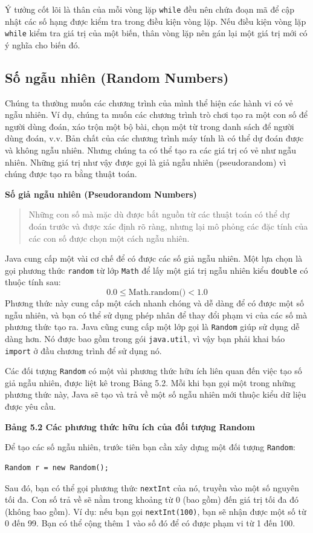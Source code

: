 Ý tưởng cốt lõi là thân của mỗi vòng lặp \texttt{while} đều nên chứa đoạn mã để cập nhật các số hạng được kiểm tra trong điều kiện vòng lặp. Nếu điều kiện vòng lặp \texttt{while} kiểm tra giá trị của một biến, thân vòng lặp nên gán lại một giá trị mới có ý nghĩa cho biến đó.

\subsection*{Số ngẫu nhiên (Random Numbers)}

Chúng ta thường muốn các chương trình của mình thể hiện các hành vi có vẻ ngẫu nhiên. Ví dụ, chúng ta muốn các chương trình trò chơi tạo ra một con số để người dùng đoán, xáo trộn một bộ bài, chọn một từ trong danh sách để người dùng đoán, v.v. Bản chất của các chương trình máy tính là có thể dự đoán được và không ngẫu nhiên. Nhưng chúng ta có thể tạo ra các giá trị có vẻ như ngẫu nhiên. Những giá trị như vậy được gọi là giả ngẫu nhiên (pseudorandom) vì chúng được tạo ra bằng thuật toán.

\textbf{Số giả ngẫu nhiên (Pseudorandom Numbers)}
\begin{quote}
Những con số mà mặc dù được bắt nguồn từ các thuật toán có thể dự đoán trước và được xác định rõ ràng, nhưng lại mô phỏng các đặc tính của các con số được chọn một cách ngẫu nhiên.
\end{quote}

Java cung cấp một vài cơ chế để có được các số giả ngẫu nhiên. Một lựa chọn là gọi phương thức \texttt{random} từ lớp \texttt{Math} để lấy một giá trị ngẫu nhiên kiểu \texttt{double} có thuộc tính sau:
\[
0.0 \le \text{Math.random()} < 1.0
\]
Phương thức này cung cấp một cách nhanh chóng và dễ dàng để có được một số ngẫu nhiên, và bạn có thể sử dụng phép nhân để thay đổi phạm vi của các số mà phương thức tạo ra. Java cũng cung cấp một lớp gọi là \texttt{Random} giúp sử dụng dễ dàng hơn. Nó được bao gồm trong gói \texttt{java.util}, vì vậy bạn phải khai báo \texttt{import} ở đầu chương trình để sử dụng nó.

Các đối tượng \texttt{Random} có một vài phương thức hữu ích liên quan đến việc tạo số giả ngẫu nhiên, được liệt kê trong Bảng 5.2. Mỗi khi bạn gọi một trong những phương thức này, Java sẽ tạo và trả về một số ngẫu nhiên mới thuộc kiểu dữ liệu được yêu cầu.

\textbf{Bảng 5.2 Các phương thức hữu ích của đối tượng Random}

Để tạo các số ngẫu nhiên, trước tiên bạn cần xây dựng một đối tượng \texttt{Random}:
\begin{verbatim}
Random r = new Random();
\end{verbatim}
Sau đó, bạn có thể gọi phương thức \texttt{nextInt} của nó, truyền vào một số nguyên tối đa. Con số trả về sẽ nằm trong khoảng từ 0 (bao gồm) đến giá trị tối đa đó (không bao gồm). Ví dụ: nếu bạn gọi \texttt{nextInt(100)}, bạn sẽ nhận được một số từ 0 đến 99. Bạn có thể cộng thêm 1 vào số đó để có được phạm vi từ 1 đến 100.

